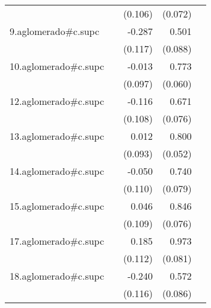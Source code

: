 {\begin{longtable}{l*{4}{D{.}{.}{-1}}}
            &                     &     (0.106)         &     (0.072)         &                     \\
\addlinespace
9.aglomerado#c.supc&                     &      -0.287\sym{*}  &       0.501\sym{***}&                     \\
            &                     &     (0.117)         &     (0.088)         &                     \\
\addlinespace
10.aglomerado#c.supc&                     &      -0.013         &       0.773\sym{***}&                     \\
            &                     &     (0.097)         &     (0.060)         &                     \\
\addlinespace
12.aglomerado#c.supc&                     &      -0.116         &       0.671\sym{***}&                     \\
            &                     &     (0.108)         &     (0.076)         &                     \\
\addlinespace
13.aglomerado#c.supc&                     &       0.012         &       0.800\sym{***}&                     \\
            &                     &     (0.093)         &     (0.052)         &                     \\
\addlinespace
14.aglomerado#c.supc&                     &      -0.050         &       0.740\sym{***}&                     \\
            &                     &     (0.110)         &     (0.079)         &                     \\
\addlinespace
15.aglomerado#c.supc&                     &       0.046         &       0.846\sym{***}&                     \\
            &                     &     (0.109)         &     (0.076)         &                     \\
\addlinespace
17.aglomerado#c.supc&                     &       0.185         &       0.973\sym{***}&                     \\
            &                     &     (0.112)         &     (0.081)         &                     \\
\addlinespace
18.aglomerado#c.supc&                     &      -0.240\sym{*}  &       0.572\sym{***}&                     \\
            &                     &     (0.116)         &     (0.086)         &                     \\

\end{longtable}}
